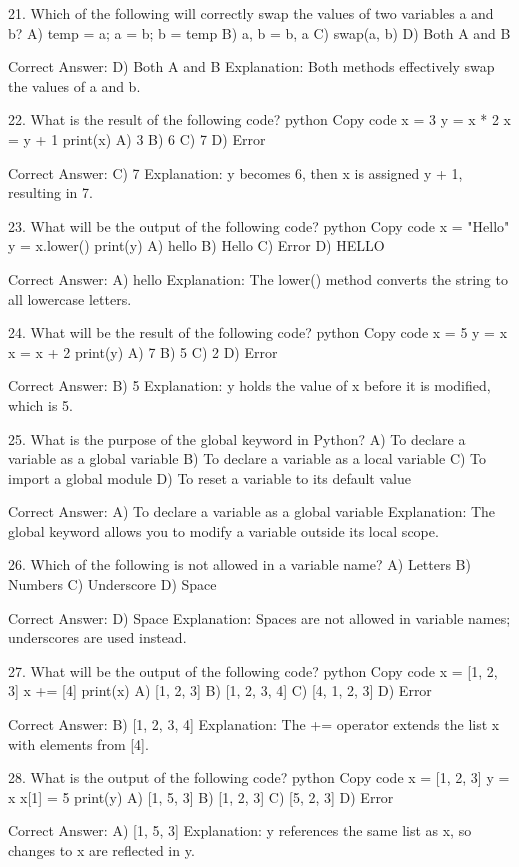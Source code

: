 21. Which of the following will correctly swap the values of two variables a and b?
A) temp = a; a = b; b = temp
B) a, b = b, a
C) swap(a, b)
D) Both A and B

Correct Answer: D) Both A and B
Explanation: Both methods effectively swap the values of a and b.

22. What is the result of the following code?
python
Copy code
x = 3
y = x * 2
x = y + 1
print(x)
A) 3
B) 6
C) 7
D) Error

Correct Answer: C) 7
Explanation: y becomes 6, then x is assigned y + 1, resulting in 7.

23. What will be the output of the following code?
python
Copy code
x = "Hello"
y = x.lower()
print(y)
A) hello
B) Hello
C) Error
D) HELLO

Correct Answer: A) hello
Explanation: The lower() method converts the string to all lowercase letters.

24. What will be the result of the following code?
python
Copy code
x = 5
y = x
x = x + 2
print(y)
A) 7
B) 5
C) 2
D) Error

Correct Answer: B) 5
Explanation: y holds the value of x before it is modified, which is 5.

25. What is the purpose of the global keyword in Python?
A) To declare a variable as a global variable
B) To declare a variable as a local variable
C) To import a global module
D) To reset a variable to its default value

Correct Answer: A) To declare a variable as a global variable
Explanation: The global keyword allows you to modify a variable outside its local scope.

26. Which of the following is not allowed in a variable name?
A) Letters
B) Numbers
C) Underscore
D) Space

Correct Answer: D) Space
Explanation: Spaces are not allowed in variable names; underscores are used instead.

27. What will be the output of the following code?
python
Copy code
x = [1, 2, 3]
x += [4]
print(x)
A) [1, 2, 3]
B) [1, 2, 3, 4]
C) [4, 1, 2, 3]
D) Error

Correct Answer: B) [1, 2, 3, 4]
Explanation: The += operator extends the list x with elements from [4].

28. What is the output of the following code?
python
Copy code
x = [1, 2, 3]
y = x
x[1] = 5
print(y)
A) [1, 5, 3]
B) [1, 2, 3]
C) [5, 2, 3]
D) Error

Correct Answer: A) [1, 5, 3]
Explanation: y references the same list as x, so changes to x are reflected in y.

